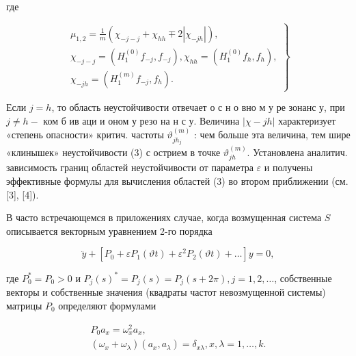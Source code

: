 \documentclass[10pt]{article}
\begin{document}
где



\[

\left.\begin{array}{c}

\mu_{1,2}=\frac{1}{m}\left(\chi_{-j-j}+\chi_{h h} \mp 2\left|\chi_{-j h}\right|\right), \\

\chi_{-j-j}=\left(H_{1}^{(0)} f_{-j}, f_{-j}\right), \chi_{h h}=\left(H_{1}^{(0)} f_{h}, f_{h}\right), \\

\chi_{-j h}=\left(H_{1}^{(m)} f_{-j}, f_{h}\right) .

\end{array}\right\}

\]



Если $j=h$, то область неустойчивости отвечает о с н о вно м у ре зонанс у, при $j \neq h-$ ком б ив аци и оном у резо на н с у. Величина $|\chi-j h|$ характеризует «степень опасности» критич. частоты $\vartheta_{j h_{j}}^{(m)}$ : чем больше эта величина, тем шире «клинышек» неустойчивости (3) с острием в точке $\vartheta_{j h}^{(m)}$. Установлена аналитич. зависимость границ областей неустойчивости от параметра $\varepsilon$ и получены эффективные формулы для вычисления областей (3) во втором приближении (см. [3], [4]).



В часто встречающемся в приложениях случае, когда возмущенная система $S$ описывается векторным уравнением 2-го порядка



\[

\ddot{y}+\left[P_{0}+\varepsilon P_{1}(\vartheta t)+\varepsilon^{2} P_{2}(\vartheta t)+\ldots\right] y=0,

\]



где $P_{0}^{*}=P_{0}>0$ и $P_{j}(s)^{*}=P_{j}(s)=P_{j}(s+2 \pi), j=1,2, \ldots$, собственные векторы и собственные значения (квадраты частот невозмущенной системы) матрицы $P_{0}$ определяют формулами



\[

\begin{gathered}

P_{0} a_{x}=\omega_{x}^{2} a_{x}, \\

\left(\omega_{x}+\omega_{\lambda}\right)\left(a_{x}, a_{\lambda}\right)=\delta_{x \lambda}, x, \lambda=1, \ldots, k .

\end{gathered}

\]
\end{document}
